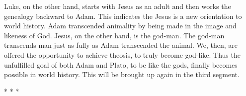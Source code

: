 Luke, on the other hand, starts with Jesus as an adult and then works the genealogy backward to Adam. This indicates the Jesus is a new orientation to world history. Adam transcended animality by being made in the image and likeness of God. Jesus, on the other hand, is the god-man. The god-man transcends man just as fully as Adam transcended the animal. We, then, are offered the opportunity to achieve theosis, to truly become god-like. Thus the unfulfilled goal of both Adam and Plato, to be like the gods, finally becomes possible in world history. This will be brought up again in the third segment.




\begin{center}* * *\end{center}

